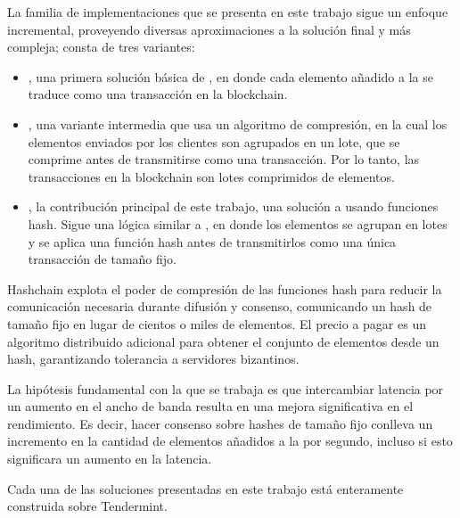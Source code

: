 La familia de implementaciones que se presenta en este trabajo
sigue un enfoque incremental, proveyendo diversas aproximaciones
a la solución final y más compleja; consta de tres variantes:
\begin{itemize}
  \item \textit{\vanilla}, una primera solución básica de \setchain, en donde cada elemento añadido
  a la \setchain se traduce como una transacción en la blockchain.
  \item \textit{\compresschain}, una variante intermedia que usa un algoritmo de compresión,
  en la cual los elementos enviados por los clientes son agrupados en un lote, que se comprime antes
  de transmitirse como una transacción. Por lo tanto, las transacciones en la blockchain son
  lotes comprimidos de elementos.
  \item \textit{\hashchain}, la contribución principal de este trabajo, una solución 
  a \setchain usando funciones hash. Sigue una lógica similar a \compresschain,
  en donde los elementos se agrupan en lotes y se aplica una función hash antes de transmitirlos
  como una única transacción de tamaño fijo.
\end{itemize}
%
Hashchain explota el poder de compresión de las funciones hash para reducir la
comunicación necesaria durante difusión y consenso, comunicando un hash de tamaño
fijo en lugar de cientos o miles de elementos.
%
El precio a pagar es un algoritmo distribuido adicional para obtener el conjunto de
elementos desde un hash, garantizando tolerancia a servidores bizantinos.
%

La hipótesis fundamental con la que se trabaja es que intercambiar latencia por un aumento en el
ancho de banda resulta en una mejora significativa en el rendimiento.
%
Es decir, hacer consenso sobre hashes de tamaño fijo conlleva un incremento en la cantidad de elementos
añadidos a la \setchain por segundo, incluso si esto significara un aumento en la latencia.

Cada una de las soluciones presentadas en este trabajo está enteramente construida sobre Tendermint.



